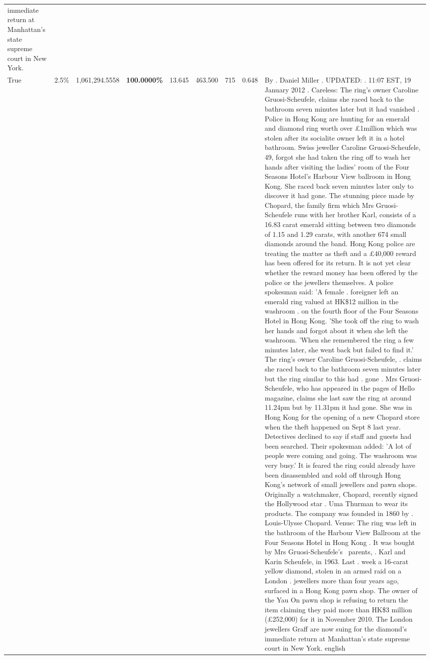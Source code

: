 \begin{table}[H]
\begin{tabular}{lllrlllll}
immediate return at Manhattan’s state supreme court in New York.   \\
\cline{1-9}
True & 2.5\% & 1,061,294.5558 & \bfseries \color{red} 100.0000\% & 13.645 & 463.500 & 715 & 0.648 & By . Daniel Miller . UPDATED: . 11:07 EST, 19 January 2012 . Careless: The ring's owner Caroline Gruosi-Scheufele, claims she raced back to the bathroom seven minutes later but it had vanished . Police in Hong Kong are hunting for an emerald and diamond ring worth over £1million which was stolen after its socialite owner left it in a hotel bathroom. Swiss jeweller Caroline Gruosi-Scheufele, 49, forgot she had taken the ring off to wash her hands after visiting the ladies' room of the Four Seasons Hotel's Harbour View ballroom in Hong Kong. She raced back seven minutes later only to discover it had gone. The stunning piece made by Chopard, the family firm which Mrs Gruosi-Scheufele runs with her brother Karl, consists of a 16.83 carat emerald sitting between two diamonds of 1.15 and 1.29 carats, with another 674 small diamonds around the band. Hong Kong police are treating the matter as theft and a £40,000 reward has been offered for its return. It is not yet clear whether the reward money has been offered by the police or the jewellers themselves. A police spokesman said: 'A female . foreigner left an emerald ring valued at HK\$12 million in the washroom . on the fourth floor of the Four Seasons Hotel in Hong Kong. 'She took off the ring to wash her hands and forgot about it when she left the washroom. 'When she remembered the ring a few minutes later, she went back but failed to find it.' The ring's owner Caroline Gruosi-Scheufele, . claims she raced back to the bathroom seven minutes later but the ring similar to this had . gone . Mrs Gruosi-Scheufele, who has appeared in the pages of Hello magazine, claims she last saw the ring at around 11.24pm but by 11.31pm it had gone. She was in Hong Kong for the opening of a new Chopard store when the theft happened on Sept 8 last year. Detectives declined to say if staff and guests had been searched. Their spokesman added: 'A lot of people were coming and going. The washroom was very busy.' It is feared the ring could already have been disassembled and sold off through Hong Kong's network of small jewellers and pawn shops. Originally a watchmaker, Chopard, recently signed the Hollywood star . Uma Thurman to wear its products. The company was founded in 1860 by . Louis-Ulysse Chopard. Venue: The ring was left in the bathroom of the Harbour View Ballroom at the Four Seasons Hotel in Hong Kong . It was bought by Mrs Gruosi-Scheufele's  parents, . Karl and Karin Scheufele, in 1963. Last . week a 16-carat yellow diamond, stolen in an armed raid on a London . jewellers more than four years ago, surfaced in a Hong Kong pawn shop. The owner of the Yau On pawn shop is refusing to return the item claiming they paid more than HK\$3 million (£252,000) for it in November 2010. The London jewellers Graff are now suing for the diamond’s immediate return at Manhattan’s state supreme court in New York. english \\

\end{tabular}
\end{table}
